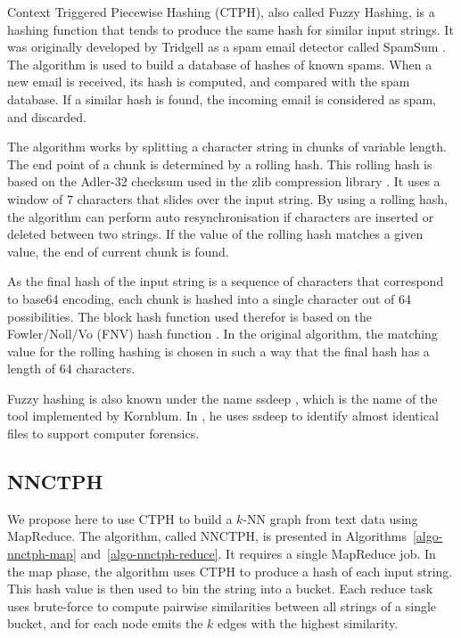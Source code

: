\documentclass[wcp]{jmlr}
\begin{document}
Context Triggered Piecewise Hashing (CTPH), also called Fuzzy Hashing, is a hashing function that tends to produce the same hash for similar input strings. It was originally developed by Tridgell as a spam email detector called SpamSum \cite{SpamSum}. The algorithm is used to build a database of hashes of known spams. When a new email is received, its hash is computed, and compared with the spam database. If a similar hash is found, the incoming email is considered as spam, and discarded.

The algorithm works by splitting a character string in chunks of variable length. The end point of a chunk is determined by a rolling hash. This rolling hash is based on the Adler-32 checksum used in the zlib compression library \cite{zlib}. It uses a window of 7 characters that slides over the input string. By using a rolling hash, the algorithm can perform auto resynchronisation if characters are inserted or deleted between two strings. If the value of the rolling hash matches a given value, the end of current chunk is found.

As the final hash of the input string is a sequence of characters that correspond to base64 encoding, each chunk is hashed into a single character out of 64 possibilities. The block hash function used therefor is based on the Fowler/Noll/Vo (FNV) hash function \cite{FNV}. In the original algorithm, the matching value for the rolling hashing is chosen in such a way that the final hash has a length of 64 characters.

Fuzzy hashing is also known under the name ssdeep \cite{ssdeep}, which is the name of the tool implemented by Kornblum. In \cite{Kornblum200691}, he uses ssdeep to identify almost identical files to support computer forensics.

\subsection{NNCTPH}

We propose here to use CTPH to build a $k$-NN graph from text data using MapReduce. The algorithm, called NNCTPH, is presented in Algorithms~\ref{algo-nnctph-map} and~\ref{algo-nnctph-reduce}. It requires a single MapReduce job. In the map phase, the algorithm uses CTPH to produce a hash of each input string. This hash value is then used to bin the string into a bucket. Each reduce task uses brute-force to compute pairwise similarities between all strings of a single bucket, and for each node emits the $k$ edges with the highest similarity.
\end{document}
